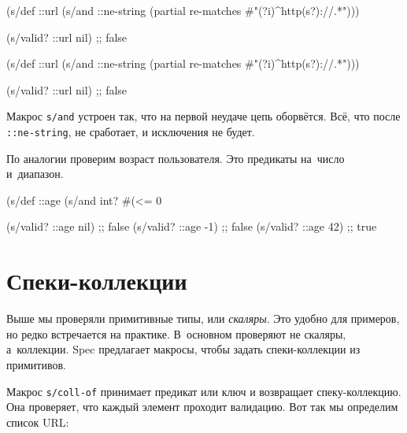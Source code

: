 \ifx\DEVICETYPE\MOBILE

\begin{english}
  \begin{clojure}
(s/def ::url
  (s/and ::ne-string
         (partial re-matches
           #"(?i)^http(s?)://.*")))

(s/valid? ::url nil) ;; false
  \end{clojure}
\end{english}

\else

\begin{english}
  \begin{clojure}
(s/def ::url
  (s/and ::ne-string
         (partial re-matches #"(?i)^http(s?)://.*")))

(s/valid? ::url nil) ;; false
  \end{clojure}
\end{english}

\fi


Макрос \verb|s/and| устроен так, что на первой неудаче цепь
оборвётся. Всё, что после \verb|::ne-string|, не сработает, и
исключения не будет.

По аналогии проверим возраст пользователя. Это предикаты на~число и~диапазон.

\begin{english}
  \begin{clojure}
(s/def ::age
  (s/and int? #(<= 0 %

(s/valid? ::age nil) ;; false
(s/valid? ::age -1)  ;; false
(s/valid? ::age 42)  ;; true
  \end{clojure}
\end{english}

\section{Спеки-коллекции}


Выше мы проверяли примитивные типы, или \emph{скаляры}. Это удобно для примеров,
но редко встречается на практике. В~основном проверяют не скаляры,
а~коллекции. Spec предлагает макросы, чтобы задать спеки-коллекции из
примитивов.


Макрос \verb|s/coll-of| принимает предикат или ключ и возвращает
спеку-коллекцию. Она проверяет, что каждый элемент проходит валидацию. Вот так
мы определим список URL:

